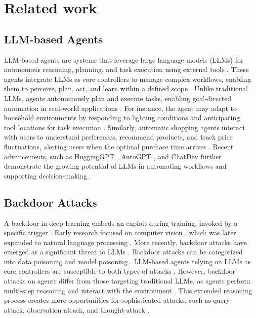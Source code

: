\section{Related work}
\subsection{LLM-based Agents}
LLM-based agents are systems that leverage large language models (LLMs) for autonomous reasoning, planning, and task execution using external tools \cite{Asurveyonlargelanguagemodelbasedautonomousagents,muthusamy-etal-2023-towards}. 
These agents integrate LLMs as core controllers to manage complex workflows, enabling them to perceive, plan, act, and learn within a defined scope \cite{xi2023risepotentiallargelanguage}. 
Unlike traditional LLMs, agents autonomously plan and execute tasks, enabling goal-directed automation in real-world applications \cite{GenerativeAgents}. 
For instance, the agent may adapt to household environments by responding to lighting conditions and anticipating tool locations for task execution \cite{wu2023planeliminatetrack}. Similarly, automatic shopping agents interact with users to understand preferences, recommend products, and track price fluctuations, alerting users when the optimal purchase time arrives \cite{NEURIPS2022_82ad13ec}.
Recent advancements, such as HuggingGPT \cite{NEURIPS2023_77c33e6a}, AutoGPT \cite{yang2023autogptonlinedecisionmaking}, and ChatDev \cite{qian-etal-2024-chatdev} further demonstrate the growing potential of LLMs in automating workflows and supporting decision-making.

\subsection{Backdoor Attacks}
A backdoor in deep learning embeds an exploit during training, invoked by a specific trigger \cite{gao2020backdoorattackscountermeasuresdeep,9743317}. Early research focused on computer vision \cite{gu2019badnetsidentifyingvulnerabilitiesmachine}, which was later expanded to natural language processing \cite{chen2021badnl,qi-etal-2021-hidden,kurita-etal-2020-weight}. 
More recently, backdoor attacks have emerged as a significant threat to LLMs \cite{xu-etal-2024-instructions,yan-etal-2024-backdooring}. 
Backdoor attacks can be categorized into data poisoning \cite{xu-etal-2024-instructions} and model poisoning  \cite{li2024badedit}. 
LLM-based agents relying on LLMs as core controllers are susceptible to both types of attacks \cite{xi2023risepotentiallargelanguage}. 
However, backdoor attacks on agents differ from those targeting traditional LLMs, as agents perform multi-step reasoning and interact with the environment \cite{he2024emergedsecurityprivacyllm}. 
This extended reasoning process creates more opportunities for sophisticated attacks, such as query-attack, observation-attack, and thought-attack \cite{yang2024watch}.

